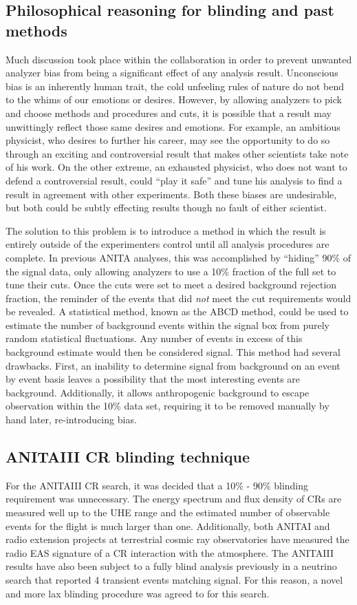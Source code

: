 	\subsection{Philosophical reasoning for blinding and past methods}
		Much discussion took place within the collaboration in order to prevent unwanted analyzer bias from being a significant effect of any analysis result.  Unconscious bias is an inherently human trait, the cold unfeeling rules of nature do not bend to the whims of our emotions or desires.  However, by allowing analyzers to pick and choose methods and procedures and cuts, it is possible that a result may unwittingly reflect those same desires and emotions.  For example, an ambitious physicist, who desires to further his career, may see the opportunity to do so through an exciting and controversial result that makes other scientists take note of his work.  On the other extreme, an exhausted physicist, who does not want to defend a controversial result, could ``play it safe'' and tune his analysis to find a result in agreement with other experiments.  Both these biases are undesirable, but both could be subtly effecting results though no fault of either scientist.
		
		The solution to this problem is to introduce a method in which the result is entirely outside of the experimenters control until all analysis procedures are complete.  In previous ANITA analyses, this was accomplished by ``hiding'' 90\% of the signal data, only allowing analyzers to use a 10\% fraction of the full set to tune their cuts.  Once the cuts were set to meet a desired background rejection fraction, the reminder of the events that did \textit{not} meet the cut requirements would be revealed.  A statistical method, known as the ABCD method, could be used to estimate the number of background events within the signal box from purely random statistical fluctuations.  Any number of events in excess of this background estimate would then be considered signal.  This method had several drawbacks. First, an inability to determine signal from background on an event by event basis leaves a possibility that the most interesting events are background.  Additionally, it allows anthropogenic background to escape observation within the 10\% data set, requiring it to be removed manually by hand later, re-introducing bias.
		
	\subsection{ANITAIII CR blinding technique}
		For the ANITAIII CR search, it was decided that a 10\% - 90\% blinding requirement was unnecessary.  The energy spectrum and flux density of CRs are measured well up to the UHE range and the estimated number of observable events for the flight is much larger than one.  Additionally, both ANITAI and radio extension projects at terrestrial cosmic ray observatories have measured the radio EAS signature of a CR interaction with the atmosphere.  The ANITAIII results have also been subject to a fully blind analysis previously in a neutrino search that reported 4 transient events matching signal.  For this reason, a novel and more lax blinding procedure was agreed to for this search.

